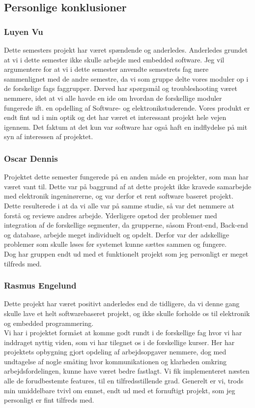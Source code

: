 \subsection{Personlige konklusioner}

\subsubsection{Luyen Vu}
Dette semesters projekt har været spændende og anderledes. Anderledes grundet at vi i dette semester ikke skulle arbejde med embedded software. Jeg vil argumentere for at vi i dette semester anvendte semestrets fag mere sammenlignet med de andre semestre, da vi som gruppe delte vores moduler op i de forskelige fags faggrupper. Derved har spørgsmål og troubleshooting været nemmere, idet at vi alle havde en ide om hvordan de forskellige moduler fungerede ift. en opdelling af Software- og elektronikstuderende. 
Vores produkt er endt fint ud i min optik og det har været et interessant projekt hele vejen igennem. Det faktum at det kun var software har også haft en indflydelse på mit syn af interessen af projektet.

\subsubsection{Oscar Dennis}
Projektet dette semester fungerede på en anden måde en projekter, som man har været vant til. Dette var på baggrund af at dette projekt ikke kravede samarbejde med elektronik ingeninørerne, og var derfor et rent software baseret projekt. Dette resulterede i at da vi alle var på samme studie, så var det nemmere at forstå og reviewe andres arbejde. Yderligere opstod der problemer med integration af de forskellige segmenter, da grupperne, såsom Front-end, Back-end og database, arbejde meget individuelt og opdelt. Derfor var der adskellige problemer som skulle løses før systemet kunne sættes sammen og fungere.\\
Dog har gruppen endt ud med et funktionelt projekt som jeg personligt er meget tilfreds med.

\subsubsection{Rasmus Engelund}
Dette projekt har været positivt anderledes end de tidligere, da vi denne gang skulle lave et helt softwarebaseret projekt, og ikke skulle forholde os til elektronik og embedded programmering.\\
Vi har i projektet formået at komme godt rundt i de forskellige fag hvor vi har inddraget nyttig viden, som vi har tilegnet os i de forskellige kurser. Her har projektets opbygning gjort opdeling af arbejdsopgaver nemmere, dog med undtagelse af nogle småting hvor kommunikationen og klarheden omkring arbejdsfordelingen, kunne have været bedre fastlagt.
Vi fik implementeret næsten alle de forudbestemte features, til en tilfredsstillende grad.
Generelt er vi, trods min umiddelbare tvivl om emnet, endt ud med et fornuftigt projekt, som jeg personligt er fint tilfreds med. 

